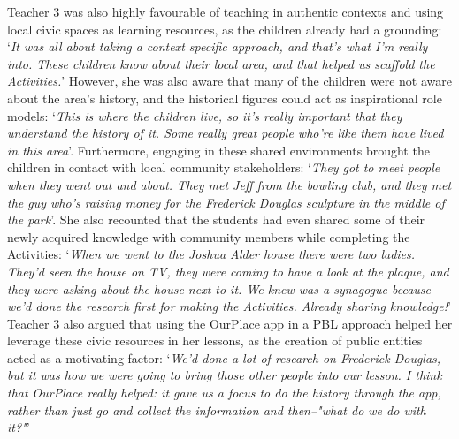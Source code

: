\documentclass[,hyphens]{sigchi}
\begin{document}
Teacher 3 was also highly favourable of teaching in authentic contexts and using local civic spaces as learning resources, as the children already had a grounding: `\textit{It was all about taking a context specific approach, and that's what I'm really into. These children know about their local area, and that helped us scaffold the Activities.}' However, she was also aware that many of the children were not aware about the area's history, and the historical figures could act as inspirational role models: `\textit{This is where the children live, so it's really important that they understand the history of it. Some really great people who're like them have lived in this area}'. Furthermore, engaging in these shared environments brought the children in contact with local community stakeholders: `\textit{They got to meet people when they went out and about. They met Jeff from the bowling club, and they met the guy who's raising money for the Frederick Douglas sculpture in the middle of the park}'. She also recounted that the students had even shared some of their newly acquired knowledge with community members while completing the Activities: `\textit{When we went to the Joshua Alder house there were two ladies. They'd seen the house on TV, they were coming to have a look at the plaque, and they were asking about the house next to it. We knew was a synagogue because we'd done the research first for making the Activities. Already sharing knowledge!}' Teacher 3 also argued that using the OurPlace app in a PBL approach helped her leverage these civic resources in her lessons, as the creation of public entities acted as a motivating factor: `\textit{We'd done a lot of research on Frederick Douglas, but it was how we were going to bring those other people into our lesson. I think that OurPlace really helped: it gave us a focus to do the history through the app, rather than just go and collect the information and then--"what do we do with it?"}' 
\end{document}

